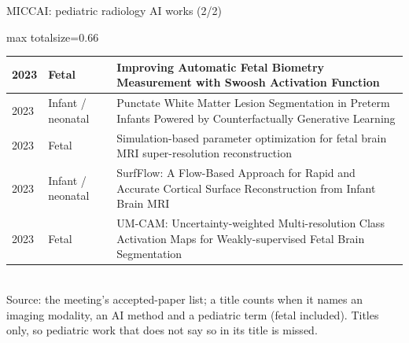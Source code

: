 \documentclass[aspectratio=169]{beamer}
\begin{document}
\begin{frame}[category=Conferences]{MICCAI: pediatric radiology AI works (2/2)}
\begin{adjustbox}{max totalsize={\textwidth}{0.66\textheight}}
\begin{tabular}{|l|l|>{\raggedright\arraybackslash}p{}|}
2023 & Fetal & Improving Automatic Fetal Biometry Measurement with Swoosh Activation Function \\ \hline
2023 & Infant / neonatal & Punctate White Matter Lesion Segmentation in Preterm Infants Powered by Counterfactually Generative Learning \\ \hline
2023 & Fetal & Simulation-based parameter optimization for fetal brain MRI super-resolution reconstruction \\ \hline
2023 & Infant / neonatal & SurfFlow: A Flow-Based Approach for Rapid and Accurate Cortical Surface Reconstruction from Infant Brain MRI \\ \hline
2023 & Fetal & UM-CAM: Uncertainty-weighted Multi-resolution Class Activation Maps for Weakly-supervised Fetal Brain Segmentation \\ \hline
\end{tabular}
\end{adjustbox}
\\[2pt]
{\tiny Source: the meeting's accepted-paper list; a title counts when it names an imaging modality, an AI method and a pediatric term (fetal included). Titles only, so pediatric work that does not say so in its title is missed.}
\end{frame}
\end{document}
